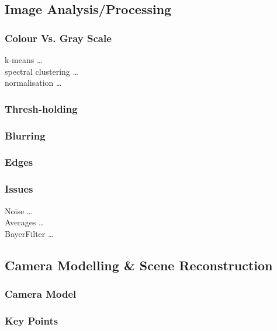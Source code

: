 \documentclass[12pt]{article}
\begin{document}
\subsection{Image Analysis/Processing}
\subsubsection{Colour Vs. Gray Scale}

k-means \ldots \\ 
spectral clustering \ldots \\ 
normalisation \ldots \\ 

\subsubsection{Thresh-holding}

\subsubsection{Blurring}

\subsubsection{Edges}

\subsubsection{Issues} 

Noise \ldots \\ 
Averages \ldots \\ 
BayerFilter \ldots \\ 


\subsection{Camera Modelling \& Scene Reconstruction}
\subsubsection{Camera Model}

\subsubsection{Key Points}
\end{document}
